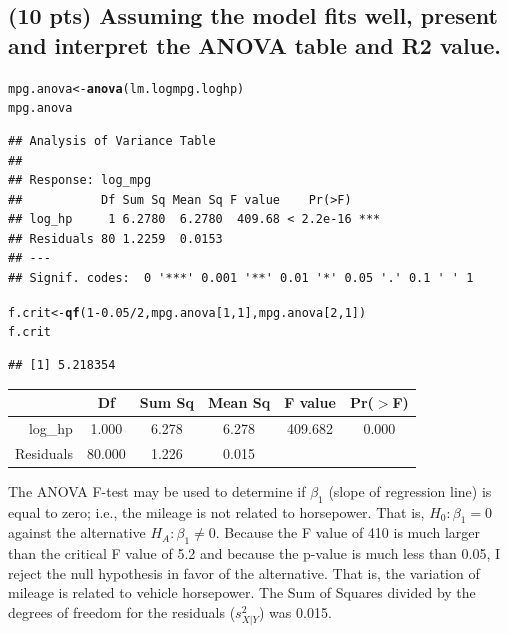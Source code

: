 \documentclass{article}\usepackage[]{graphicx}\usepackage[]{color}
\makeatletter
\newcommand{\hlnum}[1]{\textcolor[rgb]{0.686,0.059,0.569}{#1}}%
\newcommand{\hlopt}[1]{\textcolor[rgb]{0,0,0}{#1}}%
\newcommand{\hlstd}[1]{\textcolor[rgb]{0.345,0.345,0.345}{#1}}%
\newcommand{\hlkwb}[1]{\textcolor[rgb]{0.69,0.353,0.396}{#1}}%
\newcommand{\hlkwd}[1]{\textcolor[rgb]{0.737,0.353,0.396}{\textbf{#1}}}%
\newenvironment{kframe}{%
 \def\at@end@of@kframe{}%
 \ifinner\ifhmode%
  \def\at@end@of@kframe{\end{minipage}}%
  \begin{minipage}{\columnwidth}%
 \fi\fi%
 \def\FrameCommand##1{\hskip\@totalleftmargin \hskip-\fboxsep
 \colorbox{shadecolor}{##1}\hskip-\fboxsep
     \hskip-\linewidth \hskip-\@totalleftmargin \hskip\columnwidth}%
 \MakeFramed {\advance\hsize-\width
   \@totalleftmargin\z@ \linewidth\hsize
   \@setminipage}}%
 {\par\unskip\endMakeFramed%
 \at@end@of@kframe}
\newenvironment{knitrout}{}{} %
\makeatother
\begin{document}
\subsection{(10 pts) Assuming the model fits well, present and interpret the ANOVA table and R2 value.}
\begin{knitrout}
\color{fgcolor}\begin{kframe}
\begin{alltt}
\hlstd{mpg.anova} \hlkwb{<-} \hlkwd{anova}\hlstd{(lm.logmpg.loghp)}
\hlstd{mpg.anova}
\end{alltt}
\begin{verbatim}
## Analysis of Variance Table
## 
## Response: log_mpg
##           Df Sum Sq Mean Sq F value    Pr(>F)    
## log_hp     1 6.2780  6.2780  409.68 < 2.2e-16 ***
## Residuals 80 1.2259  0.0153                      
## ---
## Signif. codes:  0 '***' 0.001 '**' 0.01 '*' 0.05 '.' 0.1 ' ' 1
\end{verbatim}
\begin{alltt}
\hlstd{f.crit} \hlkwb{<-} \hlkwd{qf}\hlstd{(}\hlnum{1} \hlopt{-} \hlnum{0.05}\hlopt{/}\hlnum{2}\hlstd{, mpg.anova[}\hlnum{1}\hlstd{,}\hlnum{1}\hlstd{], mpg.anova[}\hlnum{2}\hlstd{,}\hlnum{1}\hlstd{])}
\hlstd{f.crit}
\end{alltt}
\begin{verbatim}
## [1] 5.218354
\end{verbatim}
\end{kframe}
\end{knitrout}

\begin{table}[ht]
\centering
\begin{tabular}{r|ccccc}
  \hline
 & Df & Sum Sq & Mean Sq & F value & Pr($>$F) \\ 
  \hline
log\_hp & 1.000 & 6.278 & 6.278 & 409.682 & 0.000 \\ 
  Residuals & 80.000 & 1.226 & 0.015 &  &  \\ 
   \hline
\end{tabular}
\end{table}


The ANOVA F-test may be used to determine if $\beta_1$ (slope of regression line) is equal to zero; i.e., the mileage is not related to horsepower.  That is, $H_0 : \beta_1 = 0$ against the alternative $H_A : \beta_1 \ne 0$.  Because the F value of 410 is much larger than the critical F value of 5.2 and because the p-value is much less than 0.05, I reject the null hypothesis in favor of the alternative.  That is, the variation of mileage is related to vehicle horsepower.  The Sum of Squares divided by the degrees of freedom for the residuals ($s^2_{X|Y}$) was 0.015.
\end{document}
